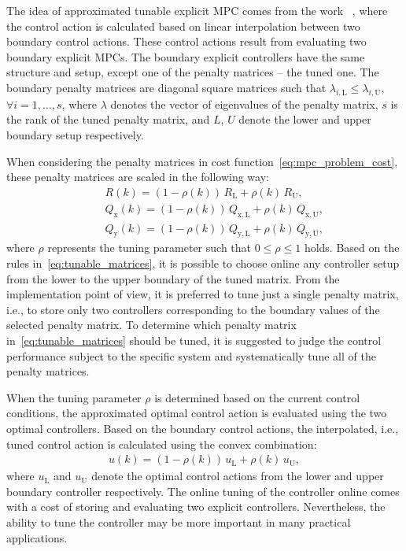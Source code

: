 \documentclass[preprint,12pt]{elsarticle}
\begin{document}
The idea of approximated tunable explicit MPC comes from the work ~\cite{Klauco_tunable}, where the control action is calculated based on linear interpolation between two boundary control actions. These control actions result from evaluating two boundary explicit MPCs. The boundary explicit controllers have the same structure and setup, except one of the penalty matrices -- the tuned one. The boundary penalty matrices are diagonal square matrices such that $\lambda_{i,\mathrm{L}} \le \lambda_{i,\mathrm{U}}$, $\forall i = 1,\dots,s$, where $\lambda$ denotes the vector of eigenvalues of the penalty matrix, $s$ is the rank of the tuned penalty matrix, and $L$, $U$ denote the lower and upper boundary setup respectively.

When considering the penalty matrices in cost function~\eqref{eq:mpc_problem_cost}, these penalty matrices are scaled in the following way:
\begin{subequations}
	\label{eq:tunable_matrices}
	\begin{eqnarray}
		\label{eq:tunable_R}
		&~& R(k) = (1-\rho(k)) \, R_\mathrm{L} + \rho(k) \, R_\mathrm{U}, \\
		\label{eq:tunable_Qx}
		&~& Q_\mathrm{x}(k) = (1-\rho(k)) \, Q_\mathrm{x,L} + \rho(k) \, Q_\mathrm{x,U}, \\
		\label{eq:tunable_Qy}
		&~& Q_\mathrm{y}(k) = (1-\rho(k)) \, Q_\mathrm{y,L} + \rho(k) \, Q_\mathrm{y,U},
	\end{eqnarray}
\end{subequations}
where $\rho$ represents the tuning parameter such that $0 \le \rho \le 1$ holds. Based on the rules in~\eqref{eq:tunable_matrices}, it is possible to choose online any controller setup from the lower to the upper boundary of the tuned matrix. From the implementation point of view, it is preferred to tune just a single penalty matrix, i.e., to store only two controllers corresponding to the boundary values of the selected penalty matrix. To determine which penalty matrix in~\eqref{eq:tunable_matrices} should be tuned, it is suggested to judge the control performance subject to the specific system and systematically tune all of the penalty matrices.

When the tuning parameter $\rho$ is determined based on the current control conditions, the approximated optimal control action is evaluated using the two optimal controllers. Based on the boundary control actions, the interpolated, i.e., tuned control action is calculated using the convex combination:
	\begin{eqnarray}
		\label{eq:tunable_u}
		u(k) = (1-\rho(k)) \, u_\mathrm{L} + \rho(k) \, u_\mathrm{U},
	\end{eqnarray}
where $u_\mathrm{L}$ and $u_\mathrm{U}$ denote the optimal control actions from the lower and upper boundary controller respectively. The online tuning of the controller online comes with a cost of storing and evaluating two explicit controllers. Nevertheless, the ability to tune the controller may be more important in many practical applications.
\end{document}
